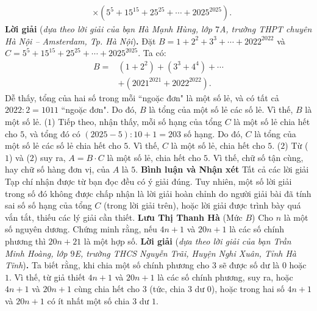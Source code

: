 \begin{multicols}{2}
\begin{align*}
		&\times\!\left( {{5^5} + {{15}^{15}} + {{25}^{25}} +  \cdots  + {{2025}^{2025}}} \right)\!.
	\end{align*}
	\textbf{\color{thachthuctoanhoc}Lời giải} (\textit{dựa theo lời giải của bạn Hà Mạnh Hùng, lớp $7$A, trường THPT chuyên Hà Nội -- Amsterdam, Tp. Hà Nội})\textbf{\color{thachthuctoanhoc}.}
	\vskip 0.05cm
	Đặt  $B = 1 + {2^2} + {3^3} +  \cdots  + {2022^{2022}}$ và $C = {5^5} + {15^{15}} + {25^{25}} +  \cdots  + {2025^{2025}}$.
	\vskip 0.05cm 
	Ta có:
	\begin{align*}
		B = &\left( {1 + {2^2}} \right) + \left( {{3^3} + {4^4}} \right) +  \cdots\\
		  &+ \left( {{{2021}^{2021}} + {{2022}^{2022}}} \right).
	\end{align*}
	Dễ thấy, tổng của hai số trong mỗi ``ngoặc đơn" là một số lẻ, và có tất cả $2022 : 2 = 1011$ ``ngoặc đơn". Do đó, $B$ là tổng của một số lẻ các số lẻ. Vì thế, $B$ là một số lẻ.   \hfill ($1$)
	\vskip 0.05cm
	Tiếp theo, nhận thấy, mỗi số hạng của tổng $C$ là một số lẻ chia hết cho $5$, và tổng đó có $(2025 - 5) : 10 + 1 = 203$ số hạng. Do đó, $C$ là tổng của một số lẻ các số lẻ chia hết cho $5$. Vì thế, $C$ là một số lẻ, chia hết cho $5$. \hfill ($2$)
	\vskip 0.05cm
	Từ ($1$) và ($2$) suy ra, $A = B \cdot C$  là một số lẻ, chia hết cho $5$. Vì thế, chữ số tận cùng, hay chữ số hàng đơn vị, của $A$ là $5$.
	\vskip 0.05cm
	\textbf{\color{thachthuctoanhoc}Bình luận và Nhận xét}
	\vskip 0.05cm
	Tất cả các lời giải Tạp chí nhận được từ bạn đọc đều có ý giải đúng. Tuy nhiên, một số lời giải trong số đó không được chấp nhận là lời giải hoàn chỉnh do người giải bài đã tính sai số số hạng của tổng $C$ (trong lời giải trên), hoặc lời giải được trình bày quá vắn tắt, thiếu các lý giải cần thiết.
	\vskip 0.05cm
	\hfill	\textbf{\color{thachthuctoanhoc}Lưu Thị Thanh Hà}
	\vskip 0.05cm
	{}
	(Mức $B$) Cho $n$ là một số nguyên dương. Chứng minh rằng, nếu $4n + 1$ và $20n + 1$ là các số chính phương thì $20n + 21$ là một hợp số.
	\vskip 0.05cm
	\textbf{\color{thachthuctoanhoc}Lời giải} (\textit{dựa theo lời giải của bạn Trần Minh Hoàng, lớp $9$E, trường THCS Nguyễn Trãi, Huyện Nghi Xuân, Tỉnh Hà Tĩnh})\textbf{\color{thachthuctoanhoc}.}
	\vskip 0.05cm
	Ta biết rằng, khi chia một số chính phương cho $3$ sẽ được số dư là $0$ hoặc $1$. Vì thế, từ giả thiết $4n + 1$ và $20n + 1$ là các số chính phương, suy ra, hoặc $4n + 1$ và $20n + 1$ cùng chia hết cho $3$ (tức, chia $3$ dư $0$), hoặc trong hai số $4n + 1$ và $20n + 1$ có ít nhất một số chia $3$ dư $1$.

\end{multicols}
